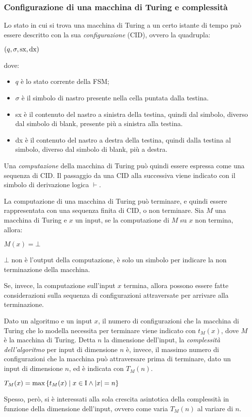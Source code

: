 \subsubsection*{Configurazione di una macchina di Turing e complessità}
Lo stato in cui si trova una macchina di Turing a un certo istante di tempo può
essere descritto con la sua \textit{configurazione} (CID), ovvero la quadrupla:
\begin{center}
    $(q, \sigma, \textnormal{sx}, \textnormal{dx})$
\end{center}
dove:
\begin{itemize}
    \item $q$ è lo stato corrente della FSM;
    \item $\sigma$ è il simbolo di nastro presente nella cella puntata dalla testina.
    \item sx è il contenuto del nastro a sinistra della testina, quindi dal simbolo, diverso dal simbolo di blank, presente più a sinistra alla testina.
    \item dx è il contenuto del nastro a destra della testina, quindi dalla testina al simbolo, diverso dal simbolo di blank, più a destra.
\end{itemize}

Una \textit{computazione} della macchina di Turing può quindi essere espressa come una sequenza di CID.
Il passaggio da una CID alla successiva viene indicato con il simbolo di derivazione logica $\vdash$.

La computazione di una macchina di Turing può terminare, e quindi essere rappresentata con una sequenza finita di CID, o non terminare.
Sia $M$ una macchina di Turing e $x$ un input, se la computazione di $M$ su $x$ non termina, allora:
\begin{center}
    $M(x) = \bot$
\end{center}
$\bot$ non è l'output della computazione, è solo un simbolo per indicare la non terminazione della macchina.

Se, invece, la computazione sull'input $x$ termina, allora possono essere fatte considerazioni sulla sequenza di configurazioni attraversate per arrivare alla terminazione.

Dato un algoritmo e un input $x$, il numero di configurazioni che la macchina di Turing che lo modella necessita per terminare viene indicato con $t_M (x)$, dove $M$ è la macchina di Turing.
Detta $n$ la dimensione dell'input, la \textit{complessità dell'algoritmo} per input di dimensione $n$ è, invece, il massimo numero di configurazioni che la macchina può attraversare prima di terminare, dato un input di dimensione $n$, ed è indicata con $T_M (n)$.
\begin{center}
    $T_M (x) = \textnormal{max} \left\{ t_M (x) \; | \; x \in \textnormal{I} \land |x| = n \right\}$
\end{center}
Spesso, però, si è interessati alla sola crescita asintotica della complessità in funzione della dimensione dell'input, ovvero come varia $T_M (n)$ al variare di $n$.

